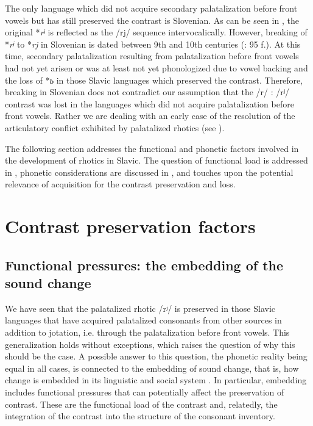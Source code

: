 \documentclass[output=paper]{langscibook}
\begin{document}
The only language which did not acquire secondary palatalization before front vowels but has still preserved the contrast is Slovenian. As can be seen in , the original *\textit{rʲ} is reflected as the /rj/ sequence intervocalically. However, breaking of *\textit{rʲ} to *\textit{rj} in Slovenian is dated between 9th and 10th centuries (\citealt{Greenberg2000}: 95 f.). At this time, secondary palatalization resulting from palatalization before front vowels had not yet arisen or was at least not yet phonologized due to vowel backing and the loss of *\textit{{ь}} in those Slavic languages which preserved the contrast. Therefore, breaking in Slovenian does not contradict our assumption that the /r/ : /rʲ/ contrast was lost in the languages which did not acquire palatalization before front vowels. Rather we are dealing with an early case of the resolution of the articulatory conflict exhibited by palatalized rhotics (see ).

The following section addresses the functional and phonetic factors involved in the development of rhotics in Slavic. The question of functional load is addressed in , phonetic considerations are discussed in , and  touches upon the potential relevance of acquisition for the contrast preservation and loss.

\section{Contrast preservation factors}
\label{sec:kavitskaya:5}
\subsection{Functional pressures: the embedding of the sound change}
\label{sec:kavitskaya:5.1}
We have seen that the palatalized rhotic /rʲ/ is preserved in those Slavic languages that have acquired palatalized consonants from other sources in addition to jotation, i.e. through the palatalization before front vowels. This generalization holds without exceptions, which raises the question of why this should be the case. A possible answer to this question, the phonetic reality being equal in all cases, is connected to the embedding of sound change, that is, how change is embedded in its linguistic and social system \citep{WeinreichEtAl1968}. In particular, embedding includes functional pressures that can potentially affect the preservation of contrast. These are the functional load of the contrast and, relatedly, the integration of the contrast into the structure of the consonant inventory.
\end{document}
